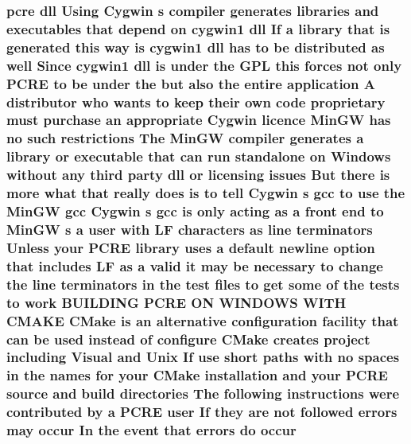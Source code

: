 \subsubsection[{\texorpdfstring{occur}{occur}}]{ {\bf pcre} dll Using Cygwin {\bf s} {\bf compiler} generates {\bf libraries} and executables that depend {\bf on} cygwin1 dll If {\bf a} {\bf library} that {\bf is} {\bf generated} {\bf this} {\bf way} {\bf is} cygwin1 dll has {\bf to} {\bf be} {\bf distributed} {\bf as} well Since cygwin1 dll {\bf is} under the {\bf G\+PL} {\bf this} forces {\bf not} only {\bf P\+C\+RE} {\bf to} {\bf be} under the but also the entire application {\bf A} distributor who wants {\bf to} keep their own {\bf code} proprietary must purchase an appropriate Cygwin {\bf licence} {\bf Min\+GW} has no such restrictions The {\bf Min\+GW} {\bf compiler} generates {\bf a} {\bf library} {\bf or} executable that {\bf can} {\bf run} standalone {\bf on} {\bf Windows} without {\bf any} third party dll {\bf or} licensing issues But there {\bf is} more {\bf what} that really does {\bf is} {\bf to} tell Cygwin {\bf s} {\bf gcc} {\bf to} use the {\bf Min\+GW} {\bf gcc} Cygwin {\bf s} {\bf gcc} {\bf is} only acting {\bf as} {\bf a} front {\bf end} {\bf to} {\bf Min\+GW} {\bf s} {\bf a} user {\bf with} {\bf LF} {\bf characters} {\bf as} {\bf line} terminators Unless your {\bf P\+C\+RE} {\bf library} uses {\bf a} {\bf default} {\bf newline} {\bf option} that includes {\bf LF} {\bf as} {\bf a} valid {\bf it} may {\bf be} necessary {\bf to} change the {\bf line} terminators {\bf in} the test {\bf files} {\bf to} get some {\bf of} the {\bf tests} {\bf to} work B\+U\+I\+L\+D\+I\+NG {\bf P\+C\+RE} ON W\+I\+N\+D\+O\+WS W\+I\+TH C\+M\+A\+KE C\+Make {\bf is} an alternative configuration {\bf facility} that {\bf can} {\bf be} {\bf used} instead {\bf of} {\bf configure} C\+Make creates {\bf project} including Visual and Unix If use short paths {\bf with} no spaces {\bf in} the {\bf names} for your C\+Make installation and your {\bf P\+C\+RE} {\bf source} and build {\bf directories} The following {\bf instructions} were contributed by {\bf a} {\bf P\+C\+RE} user If they {\bf are} {\bf not} followed {\bf errors} may occur In the event that {\bf errors} {\bf do} occur}\hypertarget{NON-AUTOTOOLS-BUILD_8txt_adc7d2050245cb9e1c144997e9ab8320f}{}\label{NON-AUTOTOOLS-BUILD_8txt_adc7d2050245cb9e1c144997e9ab8320f}
